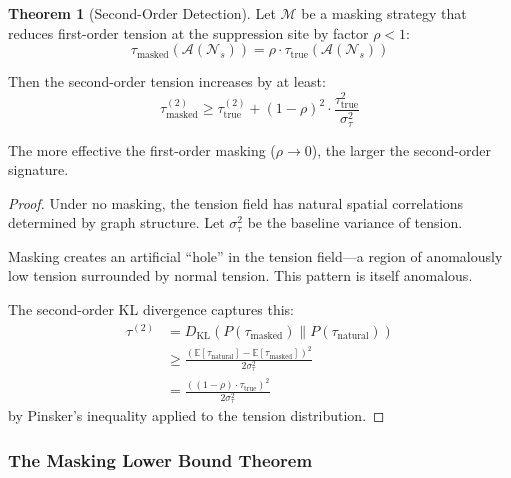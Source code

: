 \documentclass[12pt,a4paper]{article}
\theoremstyle{definition}
\newtheorem{theorem}{Theorem}[section]
\theoremstyle{remark}
\newcommand{\NS}{\mathcal{N}_s}          %
\newcommand{\CA}{\mathcal{A}}            %
\begin{document}
\begin{theorem}[Second-Order Detection]
\label{thm:second-order}
Let $\mathcal{M}$ be a masking strategy that reduces first-order tension at the suppression site by factor $\rho < 1$:
\begin{equation}
    \tau_{\text{masked}}(\CA(\NS)) = \rho \cdot \tau_{\text{true}}(\CA(\NS))
\end{equation}

Then the second-order tension increases by at least:
\begin{equation}
    \boxed{
    \tau^{(2)}_{\text{masked}} \geq \tau^{(2)}_{\text{true}} + (1 - \rho)^2 \cdot \frac{\tau_{\text{true}}^2}{\sigma_\tau^2}
    }
\end{equation}

The more effective the first-order masking ($\rho \to 0$), the larger the second-order signature.
\end{theorem}

\begin{proof}
Under no masking, the tension field has natural spatial correlations determined by graph structure. Let $\sigma_\tau^2$ be the baseline variance of tension.

Masking creates an artificial ``hole'' in the tension field—a region of anomalously low tension surrounded by normal tension. This pattern is itself anomalous.

The second-order KL divergence captures this:
\begin{align}
    \tau^{(2)} &= D_{\text{KL}}(P(\tau_{\text{masked}}) \| P(\tau_{\text{natural}})) \\
    &\geq \frac{(\mathbb{E}[\tau_{\text{natural}}] - \mathbb{E}[\tau_{\text{masked}}])^2}{2\sigma_\tau^2} \\
    &= \frac{((1-\rho) \cdot \tau_{\text{true}})^2}{2\sigma_\tau^2}
\end{align}
by Pinsker's inequality applied to the tension distribution.
\end{proof}

\subsubsection{The Masking Lower Bound Theorem}
\end{document}
